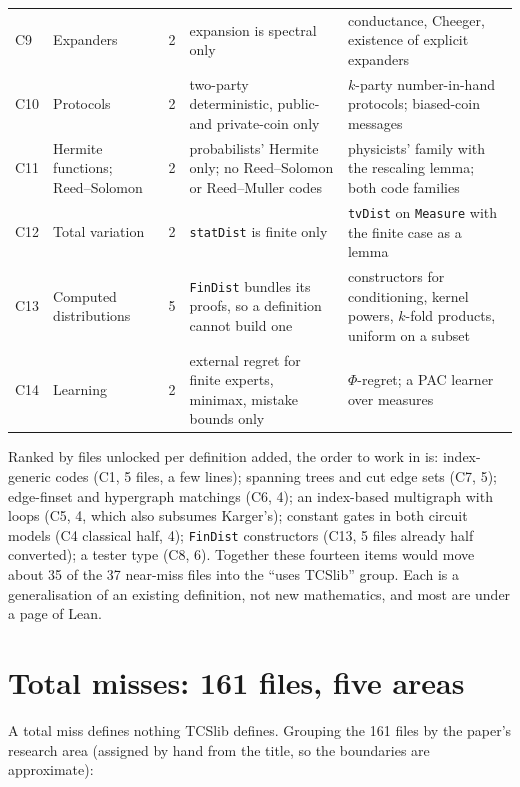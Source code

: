 \documentclass[11pt]{article}
\newcommand{\code}[1]{\texttt{#1}}
\begin{document}
\begin{center}
\begin{tabular}{@{}R{0.5cm}R{4.3cm}rR{5.3cm}R{4.3cm}@{}}
C9 & Expanders & 2 & expansion is spectral only & conductance, Cheeger, existence of explicit expanders \\
C10 & Protocols & 2 & two-party deterministic, public- and private-coin only & $k$-party number-in-hand protocols; biased-coin messages \\
C11 & Hermite functions; Reed--Solomon & 2 & probabilists' Hermite only; no Reed--Solomon or Reed--Muller codes & physicists' family with the rescaling lemma; both code families \\
C12 & Total variation & 2 & \code{statDist} is finite only & \code{tvDist} on \code{Measure} with the finite case as a lemma \\
C13 & Computed distributions & 5 & \code{FinDist} bundles its proofs, so a definition cannot build one & constructors for conditioning, kernel powers, $k$-fold products, uniform on a subset \\
C14 & Learning & 2 & external regret for finite experts, minimax, mistake bounds only & $\Phi$-regret; a PAC learner over measures \\
\bottomrule
\end{tabular}
\end{center}

Ranked by files unlocked per definition added, the order to work in is: index-generic codes (C1,
5 files, a few lines); spanning trees and cut edge sets (C7, 5); edge-finset and hypergraph
matchings (C6, 4); an index-based multigraph with loops (C5, 4, which also subsumes Karger's);
constant gates in both circuit models (C4 classical half, 4); \code{FinDist} constructors (C13, 5
files already half converted); a tester type (C8, 6). Together these fourteen items would move
about 35 of the 37 near-miss files into the ``uses TCSlib'' group. Each is a generalisation of
an existing definition, not new mathematics, and most are under a page of Lean.

\section{Total misses: 161 files, five areas}

A total miss defines nothing TCSlib defines. Grouping the 161 files by the paper's research area
(assigned by hand from the title, so the boundaries are approximate):
\end{document}
